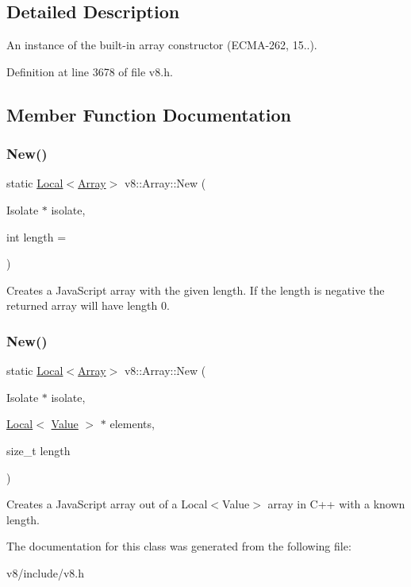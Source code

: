 \subsection{Detailed Description}
An instance of the built-\/in array constructor (E\+C\+M\+A-\/262, 15..). 

Definition at line 3678 of file v8.\+h.



\subsection{Member Function Documentation}
\mbox{\label{classv8_1_1Array_a892f18fe6a25dfc0bc7b435759a30226}} 
\subsubsection{\texorpdfstring{New()}{New()}\hspace{0.1cm}{\footnotesize\ttfamily [1/2]}}
{\footnotesize\ttfamily static \mbox{\hyperlink{classv8_1_1Local}{Local}}$<$\mbox{\hyperlink{classv8_1_1Array}{Array}}$>$ v8\+::\+Array\+::\+New (\begin{DoxyParamCaption}\item[{Isolate $\ast$}]{isolate,  }\item[{int}]{length = {} }\end{DoxyParamCaption})\hspace{0.3cm}{\ttfamily [static]}}

Creates a Java\+Script array with the given length. If the length is negative the returned array will have length 0. \mbox{\label{classv8_1_1Array_a748ab878a787989d9970d6e647677974}} 
\subsubsection{\texorpdfstring{New()}{New()}\hspace{0.1cm}{\footnotesize\ttfamily [2/2]}}
{\footnotesize\ttfamily static \mbox{\hyperlink{classv8_1_1Local}{Local}}$<$\mbox{\hyperlink{classv8_1_1Array}{Array}}$>$ v8\+::\+Array\+::\+New (\begin{DoxyParamCaption}\item[{Isolate $\ast$}]{isolate,  }\item[{\mbox{\hyperlink{classv8_1_1Local}{Local}}$<$ \mbox{\hyperlink{classv8_1_1Value}{Value}} $>$ $\ast$}]{elements,  }\item[{size\+\_\+t}]{length }\end{DoxyParamCaption})\hspace{0.3cm}{\ttfamily [static]}}

Creates a Java\+Script array out of a Local$<$\+Value$>$ array in C++ with a known length. 

The documentation for this class was generated from the following file\+:\begin{DoxyCompactItemize}
\item 
v8/include/v8.\+h\end{DoxyCompactItemize}
